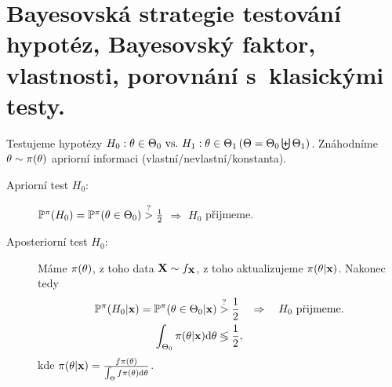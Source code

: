 \chapter{Bayesovská strategie testování hypotéz, Bayesovský faktor, vlastnosti, porovnání s~klasickými testy.}
Testujeme hypotézy $H_0: \theta\in\Theta_0 ~\text{vs.}~ H_1: \theta\in\Theta_1 \,(\Theta
=\Theta_0 \biguplus \Theta_1)$. Znáhodníme $\theta\sim\pi(\theta)$ apriorní informaci (vlastní/nevlastní/konstanta).
\begin{description}
	\item[Apriorní test $H_0$:] $\mathbb{P}^\pi(H_0)=\mathbb{P}^\pi(\theta\in\Theta_0)\stackrel{?}{>}\frac{1}{2}$ $\Rightarrow$ $H_0$ přijmeme.
	\item[Aposteriorní test $H_0$:] Máme $\pi(\theta)$, z toho data $\textbf{X}\sim f_{\textbf{X}}$, z toho aktualizujeme $\pi(\theta|\textbf{x})$. Nakonec tedy 
	\[
	\begin{split}
	 \mathbb{P}^\pi(H_0|\textbf{x})=\mathbb{P}^\pi(\theta\in\Theta_0|\textbf{x})&\stackrel{?}{>}\frac{1}{2}\quad\Rightarrow\quad H_0\text{ přijmeme.}\\
	 \int_{\Theta_0}\pi(\theta|\textbf{x})\mathrm{d}\theta & \lessgtr \frac{1}{2},
	\end{split}
	\]
	kde $\pi(\theta|\textbf{x})= \frac{f\pi(\theta)}{\int_\Theta f\pi(\theta)\mathrm{d}\theta}$.
\end{description}

